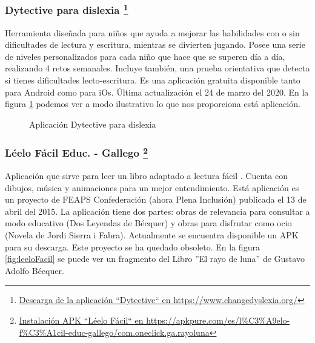 \subsubsection{{Dytective para dislexia} \footnote{\href{https://www.changedyslexia.org/}{Descarga de la aplicación ``Dytective`` en https://www.changedyslexia.org/}}}
Herramienta diseñada para niños que ayuda a mejorar las habilidades con o sin dificultades de lectura y escritura, mientras se divierten jugando. Posee una serie de niveles personalizados para cada niño que hace que se superen día a día, realizando 4 retos semanales. Incluye también, una prueba orientativa que detecta si tienes dificultades lecto-escritura.
Es una aplicación gratuita disponible tanto para Android como para iOs. Última actualización el 24 de marzo del 2020. En la figura \ref{fig:dytective} podemos ver a modo ilustrativo lo que nos proporciona está aplicación.
\begin{figure}[h]
	\centering

	\caption{Aplicación Dytective para dislexia}
	\label{fig:dytective}
\end{figure}

\subsubsection{Léelo Fácil Educ. - Gallego \footnote{\href{https://apkpure.com/es/l\%C3\%A9elo-f\%C3\%A1cil-educ-gallego/com.oneclick.ga.rayoluna}{Instalación APK ``Léelo Fácil`` en https://apkpure.com/es/l\%C3\%A9elo-f\%C3\%A1cil-educ-gallego/com.oneclick.ga.rayoluna}}}
Aplicación que sirve para leer un libro adaptado a lectura fácil . Cuenta con dibujos, música y animaciones para un mejor entendimiento. Está aplicación es un proyecto de FEAPS Confederación (ahora Plena Inclusión) publicada el 13 de abril del 2015. La aplicación tiene dos partes: obras de relevancia para consultar a modo educativo (Dos Leyendas de Bécquer) y obras para disfrutar como ocio (Novela de Jordi Sierra i Fabra). Actualmente se encuentra disponible un APK para su descarga. Este proyecto se ha quedado obsoleto. En la figura \ref{fig:leeloFacil} se puede ver un fragmento del Libro ''El rayo de luna'' de Gustavo Adolfo Bécquer.

